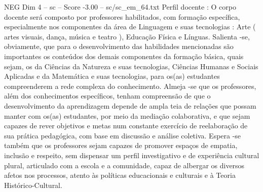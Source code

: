 \begin{textsample}{NEG Dim 4 – sc – Score -3.00 – sc/sc\_em\_64.txt}
Perfil docente : O corpo docente será composto por professores habilitados, com formação específica, especialmente nos componentes da área de Linguagem e suas tecnologias : Arte ( artes visuais, dança, música e teatro ), Educação Física e Línguas.
Salienta -se, obviamente, que para o desenvolvimento das habilidades mencionadas são importantes os conteúdos dos demais componentes da formação básica, quais sejam, os da Ciências da Natureza e suas tecnologias, Ciências Humanas e Sociais Aplicadas e da Matemática e suas tecnologias, para os(as) estudantes compreenderem a rede complexa do conhecimento.
Almeja -se que os professores, além dos conhecimentos específicos, tenham compreensão de que o desenvolvimento da aprendizagem depende de ampla teia de relações que possam manter com os(as) estudantes, por meio da mediação colaborativa, e que sejam capazes de rever objetivos e metas num constante exercício de reelaboração de sua prática pedagógica, com base em discussão e análise coletiva.
Espera -se também que os professores sejam capazes de promover espaços de empatia, inclusão e respeito, sem dispensar um perfil investigativo e de experiência cultural plural, articulado com a escola e a comunidade, capaz de albergar os diversos afetos nos processos, atento às políticas educacionais e culturais e à Teoria Histórico-Cultural.

\end{textsample}
